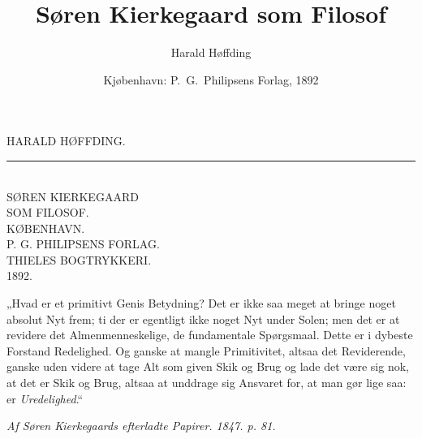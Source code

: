 \documentclass[12pt,a4paper,openany]{book}
\title{\textbf{Søren Kierkegaard som Filosof}}
\author{Harald Høffding}
\date{Kjøbenhavn: P.\ G.\ Philipsens Forlag, 1892}
\begin{document}
\maketitle
\thispagestyle{empty}
\clearpage

\begin{center}
HARALD HØFFDING.\\[12pt]
\rule{2cm}{0.4pt}\\[18pt]
{\Large SØREN KIERKEGAARD}\\[8pt]
SOM FILOSOF.\\[24pt]
KØBENHAVN.\\
P. G. PHILIPSENS FORLAG.\\[4pt]
{\small THIELES BOGTRYKKERI.}\\[4pt]
1892.
\end{center}
\clearpage

„Hvad er et primitivt Genis Betydning? Det er ikke saa
meget at bringe noget absolut Nyt frem; ti der er egentligt ikke
noget Nyt under Solen; men det er at revidere det Almenmenneskelige,
de fundamentale Spørgsmaal. Dette er i dybeste Forstand Redelighed.
Og ganske at mangle Primitivitet, altsaa det Reviderende,
ganske uden videre at tage Alt som given Skik og Brug og lade
det være sig nok, at det er Skik og Brug, altsaa at unddrage sig
Ansvaret for, at man gør lige saa: er \textit{Uredelighed}.“

\begin{flushright}\small\textit{Af Søren Kierkegaards efterladte Papirer. 1847. p. 81.}\end{flushright}
\clearpage
\end{document}
